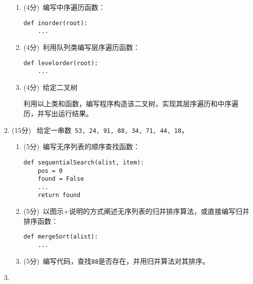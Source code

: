 \documentclass[8pt]{article}
\newlength{\ld}
\begin{document}
\begin{CJK}{UTF8}{gkai}
\begin{enumerate}
\begin{enumerate}
  \item (4分)~编写中序遍历函数：
    \begin{lstlisting}
def inorder(root):
    ...
    \end{lstlisting}
  \item (4分)~利用队列类编写层序遍历函数：
    \begin{lstlisting}
def levelorder(root):
    ...
    \end{lstlisting}
  \item (4分)~给定二叉树
    \begin{figure}[htbp]
      \centering
  \end{figure}
  
  利用以上类和函数，编写程序构造该二叉树，实现其层序遍历和中序遍历，并写出运行结果。
  \end{enumerate}
\item (15分)~ 给定一串数~\lstinline{53, 24, 91, 88, 34, 71, 44, 18}，
  \begin{enumerate}
  \item (5分)~编写无序列表的顺序查找函数：
    \begin{lstlisting}
def sequentialSearch(alist, item):
    pos = 0
    found = False
    ...          
    return found
    \end{lstlisting}
  \item (5分)~以图示+说明的方式阐述无序列表的归并排序算法，或直接编写归并排序函数：
    \begin{lstlisting}
def mergeSort(alist):
    ...      
    \end{lstlisting}
    \item (5分)~编写代码，查找\lstinline{88}是否存在，并用归并算法对其排序。
  \end{enumerate}
\item 
\end{enumerate}



\end{CJK}
\end{document}
